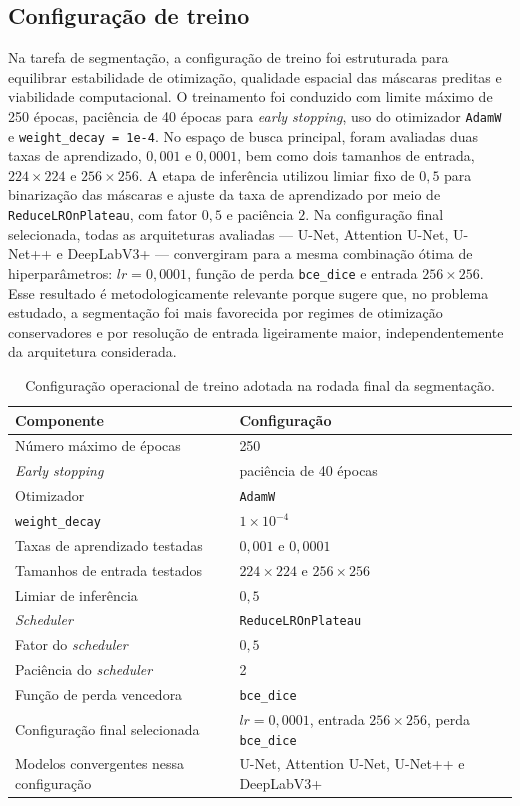 \documentclass[tcc,capa]{texufpel}
\begin{document}
\subsection{Configuração de treino} Na tarefa de segmentação, a configuração de treino foi estruturada para equilibrar estabilidade de otimização, qualidade espacial das máscaras preditas e viabilidade computacional. O treinamento foi conduzido com limite máximo de 250 épocas, paciência de 40 épocas para \textit{early stopping}, uso do otimizador \texttt{AdamW} e \texttt{weight\_decay = 1e-4}. No espaço de busca principal, foram avaliadas duas taxas de aprendizado, \(0{,}001\) e \(0{,}0001\), bem como dois tamanhos de entrada, \(224 \times 224\) e \(256 \times 256\). A etapa de inferência utilizou limiar fixo de \(0{,}5\) para binarização das máscaras e ajuste da taxa de aprendizado por meio de \texttt{ReduceLROnPlateau}, com fator \(0{,}5\) e paciência \(2\). Na configuração final selecionada, todas as arquiteturas avaliadas --- U-Net, Attention U-Net, U-Net++ e DeepLabV3+ --- convergiram para a mesma combinação ótima de hiperparâmetros: \(lr = 0{,}0001\), função de perda \texttt{bce\_dice} e entrada \(256 \times 256\). Esse resultado é metodologicamente relevante porque sugere que, no problema estudado, a segmentação foi mais favorecida por regimes de otimização conservadores e por resolução de entrada ligeiramente maior, independentemente da arquitetura considerada. \begin{table}[htbp] \centering \caption{Configuração operacional de treino adotada na rodada final da segmentação.} \label{tab:training_config_segmentation} \begin{tabular}{p{5.0cm} p{8.3cm}} \hline \textbf{Componente} & \textbf{Configuração} \\[0.2cm] \hline Número máximo de épocas & 250 \\ \textit{Early stopping} & paciência de 40 épocas \\ Otimizador & \texttt{AdamW} \\ \texttt{weight\_decay} & \(1 \times 10^{-4}\) \\ Taxas de aprendizado testadas & \(0{,}001\) e \(0{,}0001\) \\ Tamanhos de entrada testados & \(224 \times 224\) e \(256 \times 256\) \\ Limiar de inferência & \(0{,}5\) \\ \textit{Scheduler} & \texttt{ReduceLROnPlateau} \\ Fator do \textit{scheduler} & \(0{,}5\) \\ Paciência do \textit{scheduler} & 2 \\ Função de perda vencedora & \texttt{bce\_dice} \\ Configuração final selecionada & \(lr = 0{,}0001\), entrada \(256 \times 256\), perda \texttt{bce\_dice} \\ Modelos convergentes nessa configuração & U-Net, Attention U-Net, U-Net++ e DeepLabV3+ \\ \hline \end{tabular} \end{table}
\end{document}
